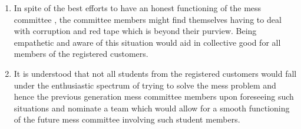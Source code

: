 \documentclass[12pt]{report}
\begin{document}
\begin{enumerate}
\item In spite of the best efforts to have an honest functioning of the mess committee , the committee 
members might find themselves having to deal with corruption and red tape which is beyond their purview. Being empathetic and aware of this situation  would aid in collective good for all members of the registered customers. 

\item It is understood that not all students from the registered customers would fall under the enthusiastic spectrum of trying to solve the mess problem and hence the previous generation mess committee members upon foreseeing such situations and nominate a team which would allow for a smooth functioning of the future mess committee involving such student members.
\end{enumerate}
\end{document}
